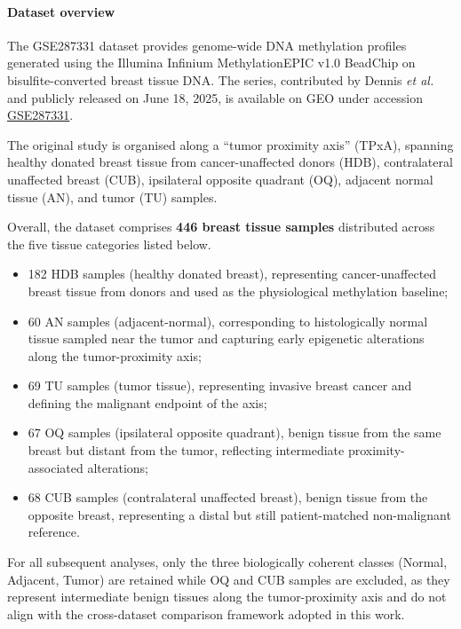 \documentclass[10pt]{extarticle}
\begin{document}
\paragraph{Dataset overview}
\label{par:gse287331_overview}

The GSE287331 dataset provides genome-wide DNA methylation profiles generated using the 
Illumina Infinium MethylationEPIC v1.0 BeadChip on bisulfite-converted breast tissue DNA. 
The series, contributed by Dennis \textit{et al.} \cite{Lord2024GSE287331} and publicly released on June 18, 2025, is 
available on GEO under accession 
\href{https://www.ncbi.nlm.nih.gov/geo/query/acc.cgi?acc=GSE287331}{GSE287331}.  

The original study is organised along a ``tumor proximity axis'' (TPxA), spanning healthy 
donated breast tissue from cancer-unaffected donors (HDB), contralateral unaffected breast 
(CUB), ipsilateral opposite quadrant (OQ), adjacent normal tissue (AN), and tumor (TU) 
samples. 

Overall, the dataset comprises \textbf{446 breast tissue samples} distributed across the 
five tissue categories listed below. 

\begin{itemize}[label=-]
    \item 182 HDB samples (healthy donated breast), representing cancer-unaffected breast tissue from donors and used as the physiological methylation baseline;
    \item 60 AN samples (adjacent-normal), corresponding to histologically normal tissue sampled near the tumor and capturing early epigenetic alterations along the tumor-proximity axis;
    \item 69 TU samples (tumor tissue), representing invasive breast cancer and defining the malignant endpoint of the axis;
    \item 67 OQ samples (ipsilateral opposite quadrant), benign tissue from the same breast but distant from the tumor, reflecting intermediate proximity-associated alterations;
    \item 68 CUB samples (contralateral unaffected breast), benign tissue from the opposite breast, representing a distal but still patient-matched non-malignant reference.
\end{itemize}
For all subsequent analyses, only the three biologically coherent classes (Normal, Adjacent, Tumor) are retained
while OQ and CUB samples are excluded, as they represent intermediate benign tissues along the tumor-proximity axis and do not align 
with the cross-dataset comparison framework adopted in this work.
\end{document}
